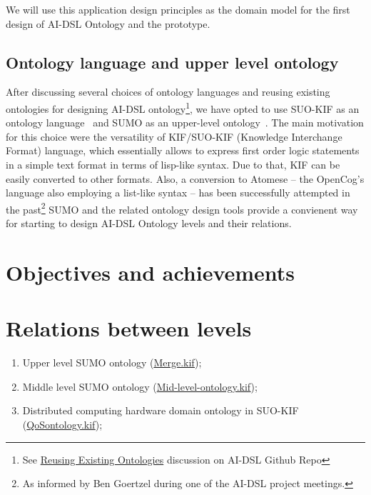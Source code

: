 \documentclass[]{report}
\newcommand{\kabir}[2][]{\todo[color=yellow,author=kabir, #1]{#2}}
\begin{document}
We will use this application design principles as the domain model for the first
design of AI-DSL Ontology and the prototype.

\subsection{Ontology language and upper level ontology}

After discussing several choices of ontology languages and reusing existing
ontologies for designing AI-DSL ontology\footnote{See
\href{https://github.com/singnet/ai-dsl/discussions/18}{Reusing Existing
Ontologies} discussion on AI-DSL Github Repo\cite{AIDSLRepo}}, we have opted to
use SUO-KIF as an ontology language~\cite{pease_standard_2009} and SUMO as an
upper-level ontology~\cite{NilesPease2001}. The main motivation for this choice
were the versatility of KIF/SUO-KIF (Knowledge Interchange Format) language,
which essentially allows to express first order logic statements in a simple
text format in terms of lisp-like syntax. Due to that, KIF can be easily
converted to other formats\cite{kalibatiene_survey_2011}. Also, a conversion to
Atomese -- the OpenCog's language also employing a list-like syntax -- has been
successfully attempted in the past\footnote{As informed by Ben Goertzel during
one of the AI-DSL project meetings.} SUMO and the related ontology design tools
\cite{pease_sigma_2001} provide a convienent way for starting to design AI-DSL
Ontology levels and their relations.

\kabir[inline]{Finished here: 2021-05-27T01:37 CET}

\section{Objectives and achievements}

\section{Relations between levels}

\begin{enumerate}
  \item Upper level SUMO ontology
  (\href{https://github.com/ontologyportal/sumo/blob/master/Merge.kif}{Merge.kif});
  \item Middle level SUMO ontology
(\href{https://github.com/ontologyportal/sumo/blob/master/Mid-level-ontology.kif}{Mid-level-ontology.kif});
  \item Distributed computing hardware domain ontology in SUO-KIF
(\href{https://github.com/ontologyportal/sumo/blob/master/QoSontology.kif}{QoSontology.kif});
\end{enumerate}
\end{document}
